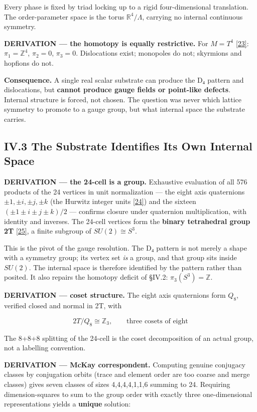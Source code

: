 \documentclass[a4paper,11pt]{article}
\begin{document}
Every phase is fixed by triad locking up to a rigid four-dimensional translation. The order-parameter space is the torus $\mathbb{R}^4/\Lambda$, carrying no internal continuous symmetry.

\textbf{DERIVATION — the homotopy is equally restrictive.} For $M=T^4$ \hyperref[ref23]{[23]}: $\pi_1=\mathbb{Z}^4$, $\pi_2=0$, $\pi_3=0$. Dislocations exist; monopoles do not; skyrmions and hopfions do not.

\textbf{Consequence.} A single real scalar substrate can produce the D₄ pattern and dislocations, but \textbf{cannot produce gauge fields or point-like defects}. Internal structure is forced, not chosen. The question was never which lattice symmetry to promote to a gauge group, but what internal space the substrate carries.

\subsection*{IV.3 The Substrate Identifies Its Own Internal Space}

\textbf{DERIVATION — the 24-cell is a group.} Exhaustive evaluation of all 576 products of the 24 vertices in unit normalization — the eight axis quaternions $\pm1,\pm i,\pm j,\pm k$ (the Hurwitz integer units \hyperref[ref24]{[24]}) and the sixteen $(\pm1\pm i\pm j\pm k)/2$ — confirms closure under quaternion multiplication, with identity and inverses. The 24-cell vertices form the \textbf{binary tetrahedral group 2T} \hyperref[ref25]{[25]}, a finite subgroup of $SU(2)\cong S^3$.

This is the pivot of the gauge resolution. The D₄ pattern is not merely a shape with a symmetry group; its vertex set \textit{is} a group, and that group sits inside $SU(2)$. The internal space is therefore identified by the pattern rather than posited. It also repairs the homotopy deficit of §IV.2: $\pi_3(S^3)=\mathbb{Z}$.

\textbf{DERIVATION — coset structure.} The eight axis quaternions form $Q_8$, verified closed and normal in 2T, with

\[2T/Q_8\cong\mathbb{Z}_3,\qquad\text{three cosets of eight}\]

The 8+8+8 splitting of the 24-cell is the coset decomposition of an actual group, not a labelling convention.

\textbf{DERIVATION — McKay correspondent.} Computing genuine conjugacy classes by conjugation orbits (trace and element order are too coarse and merge classes) gives seven classes of sizes 4,4,4,4,1,1,6 summing to 24. Requiring dimension-squares to sum to the group order with exactly three one-dimensional representations yields a \textbf{unique} solution:
\end{document}
